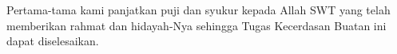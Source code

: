 \begin{acknowledgements}
Pertama-tama kami panjatkan puji dan syukur kepada Allah SWT yang telah memberikan rahmat dan hidayah-Nya sehingga Tugas Kecerdasan Buatan ini dapat diselesaikan.
\end{acknowledgements}